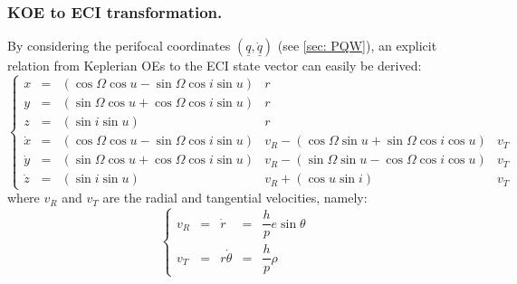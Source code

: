 		\subsubsection{KOE to ECI transformation.}
		\indent By considering the perifocal coordinates $\left(\underline{q}, \dot{\underline{q}}\right) $ (see \ref{sec: PQW}), an explicit relation from Keplerian OEs to the ECI state vector can easily be derived:
		\[\left\{ \begin{array}{cclll}
		x 		& = &\left(\cos\Omega \cos u - \sin \Omega \cos i \sin u\right)		& r &\\
		y 		& = & \left(\sin\Omega \cos u + \cos \Omega \cos i \sin u\right) 	& r &\\
		z 		& = & \left(\sin i \sin u\right) 									& r &\\
		\dot{x} & = & \left(\cos\Omega \cos u - \sin \Omega \cos i \sin u\right) 	& v_R  - \left(\cos\Omega \sin u + \sin \Omega \cos i \cos u\right) & v_T \\
		\dot{y} & = & \left(\sin\Omega \cos u + \cos \Omega \cos i \sin u\right)	& v_R  - \left(\sin\Omega \sin u - \cos \Omega \cos i \cos u\right) & v_T \\
		\dot{z} & = & \left(\sin i \sin u \right) 									& v_R + \left(\cos u \sin i \right) 								& v_T
		\end{array}\right.
		\]
		\noindent where $v_R$ and $v_T$ are the radial and tangential velocities, namely:
		\[
		\left\{ \begin{array}{lllll}
		v_R & = & \dot{r} & = & \dfrac{h}{p} e \sin \theta \\[1.5em]
		v_T & = &  r \dot{\theta} & = & \dfrac{h}{p} \rho
		\end{array}\right.
		\]
